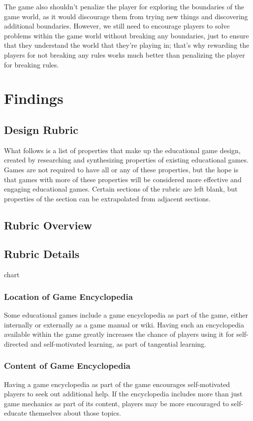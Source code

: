 \documentclass[12pt]{report}
\begin{document}
		The game also shouldn't penalize the player for exploring the boundaries of the game world, as it would discourage them from trying new things and discovering additional boundaries. However, we still need to encourage players to solve problems within the game world without breaking any boundaries, just to ensure that they understand the world that they're playing in; that's why rewarding the players for not breaking any rules works much better than penalizing the player for breaking rules.

\section{Findings}
	\subsection{Design Rubric}
		What follows is a list of properties that make up the educational game design, created by researching and synthesizing properties of existing educational games. Games are not required to have all or any of these properties, but the hope is that games with more of these properties will be considered more effective and engaging educational games. Certain sections of the rubric are left blank, but properties of the section can be extrapolated from adjacent sections.
	\subsection{Rubric Overview}
	\subsection{Rubric Details}

		chart

		\subsubsection{Location of Game Encyclopedia}
			Some educational games include a game encyclopedia as part of the game, either internally or externally as a game manual or wiki. Having such an encyclopedia available within the game greatly increases the chance of players using it for self-directed and self-motivated learning, as part of tangential learning.
		\subsubsection{Content of Game Encyclopedia}
			Having a game encyclopedia as part of the game encourages self-motivated players to seek out additional help. If the encyclopedia includes more than just game mechanics as part of its content, players may be more encouraged to self-educate themselves about those topics.
\end{document}
